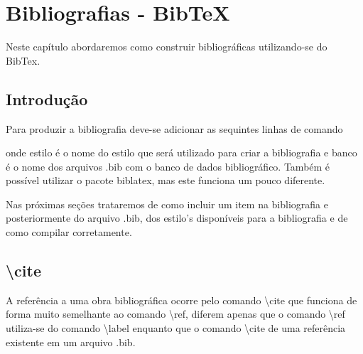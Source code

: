 % 
% 
% 
% 
% 
\chapter{Bibliografias - BibTeX} \label{sch:latex:bibtex}
Neste capítulo abordaremos como construir bibliográficas utilizando-se do BibTex.

\section{Introdução}

Para produzir a bibliografia deve-se adicionar as sequintes linhas de comando
\begin{latexcode}
    
    
\end{latexcode}
onde \textsf{estilo} é o nome do estilo que será utilizado para criar a bibliografia e \textsf{banco} é o nome dos arquivos \textsf{.bib} com o banco de dados bibliográfico. Também é possível utilizar o pacote \textsf{biblatex}, mas este funciona um pouco diferente.

Nas próximas seções trataremos de como incluir um item na bibliografia e posteriormente do arquivo \textsf{.bib}, dos \textsf{estilo}'s disponíveis para a bibliografia e de como compilar corretamente.

\section{\textbackslash\textsf{cite}}

A referência a uma obra bibliográfica ocorre pelo comando \textbackslash\textsf{cite} que funciona de forma muito semelhante ao comando \textbackslash\textsf{ref}, diferem apenas que o comando \textbackslash\textsf{ref} utiliza-se do comando \textbackslash\textsf{label} enquanto que o comando \textbackslash\textsf{cite} de uma referência existente em um arquivo \textsf{.bib}.

